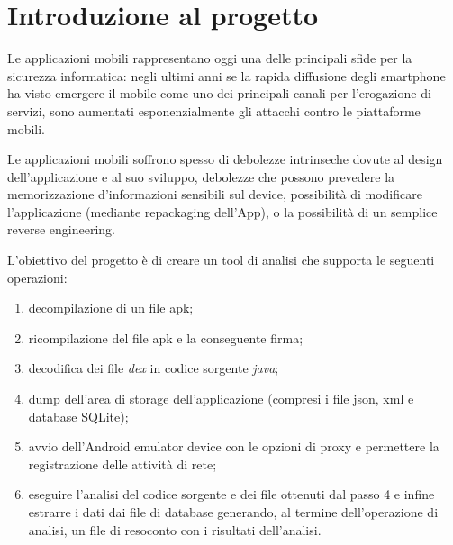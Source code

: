 \section{Introduzione al progetto}\label{sec:introduzione-al-progetto}
Le applicazioni mobili rappresentano oggi una delle principali sfide per la sicurezza informatica: negli ultimi anni se la rapida diffusione degli smartphone ha visto emergere il mobile come uno dei principali canali per l'erogazione di servizi, sono aumentati esponenzialmente gli attacchi contro le piattaforme mobili.

Le applicazioni mobili soffrono spesso di debolezze intrinseche dovute al design dell'applicazione e al suo sviluppo, debolezze che possono prevedere la memorizzazione d'informazioni sensibili sul device, possibilità di modificare l'applicazione (mediante repackaging dell'App), o la possibilità di un semplice reverse engineering.

L'obiettivo del progetto è di creare un tool di analisi che supporta le seguenti operazioni:
\begin{enumerate}
    \item decompilazione di un file apk;
    \item ricompilazione del file apk e la conseguente firma;
    \item decodifica dei file \textit{dex} in codice sorgente \textit{java};
    \item dump dell'area di storage dell'applicazione (compresi i file json, xml e database SQLite);
    \item avvio dell'Android emulator device con le opzioni di proxy e permettere la registrazione delle attività di rete;
    \item eseguire l'analisi del codice sorgente e dei file ottenuti dal passo 4 e infine estrarre i dati dai file di database generando, al termine dell'operazione di analisi, un file di resoconto con i risultati dell'analisi.
\end{enumerate}
